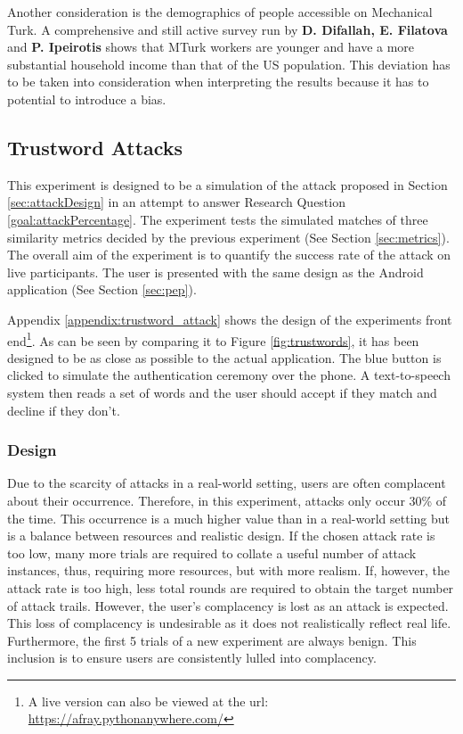 Another consideration is the demographics of people accessible on Mechanical Turk. A comprehensive and still active survey run by \textbf{D. Difallah, E. Filatova} and \textbf{P. Ipeirotis}\cite{difallah2018demographics} shows that MTurk workers are younger and have a more substantial household income than that of the US population. This deviation has to be taken into consideration when interpreting the results because it has to potential to introduce a bias.

\newpage

\subsection{Trustword Attacks}
\label{sec:exp2_design}

This experiment is designed to be a simulation of the attack proposed in Section \ref{sec:attackDesign} in an attempt to answer Research Question \ref{goal:attackPercentage}. The experiment tests the simulated matches of three similarity metrics decided by the previous experiment (See Section \ref{sec:metrics}). The overall aim of the experiment is to quantify the success rate of the attack on live participants. The user is presented with the same design as the \pep Android application (See Section \ref{sec:pep}).

Appendix \ref{appendix:trustword_attack} shows the design of the experiments front end\footnote{A live version can also be viewed at the url: \url{https://afray.pythonanywhere.com/}}. As can be seen by comparing it to Figure \ref{fig:trustwords}, it has been designed to be as close as possible to the actual application. The blue button is clicked to simulate the authentication ceremony over the phone. A text-to-speech system then reads a set of words and the user should accept if they match and decline if they don't.

\subsubsection{Design}

Due to the scarcity of attacks in a real-world setting, users are often complacent about their occurrence. Therefore, in this experiment, attacks only occur 30\% of the time. This occurrence is a much higher value than in a real-world setting but is a balance between resources and realistic design. If the chosen attack rate is too low, many more trials are required to collate a useful number of attack instances, thus, requiring more resources, but with more realism. If, however, the attack rate is too high, less total rounds are required to obtain the target number of attack trails. However, the user's complacency is lost as an attack is expected. This loss of complacency is undesirable as it does not realistically reflect real life. Furthermore, the first 5 trials of a new experiment are always benign. This inclusion is to ensure users are consistently lulled into complacency.

